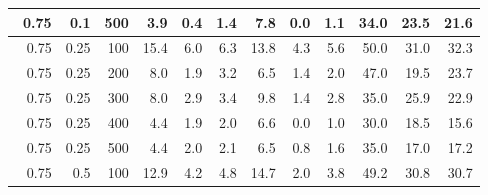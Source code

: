 \begin{longtable}{|r|r|r|r|r|r|r|r|r|r|r|r|}
    \hline \
    0.75                           & 0.1                    & 500                       & 3.9                       & 0.4                       & 1.4                       & 7.8                       & 0.0                       & 1.1                       & 34.0                      & 23.5                      & 21.6                      \\
    \hline \
    0.75                           & 0.25                    & 100                       & 15.4                       & 6.0                       & 6.3                       & 13.8                       & 4.3                       & 5.6                       & 50.0                      & 31.0                      & 32.3                      \\
    \hline \
    0.75                           & 0.25                    & 200                       & 8.0                       & 1.9                       & 3.2                       & 6.5                       & 1.4                       & 2.0                       & 47.0                      & 19.5                      & 23.7                      \\
    \hline \
    0.75                           & 0.25                    & 300                       & 8.0                       & 2.9                       & 3.4                       & 9.8                       & 1.4                       & 2.8                       & 35.0                      & 25.9                      & 22.9                      \\
    \hline \
    0.75                           & 0.25                     & 400                       & 4.4                      & 1.9                       & 2.0                       & 6.6                      & 0.0                       & 1.0                       & 30.0                      & 18.5                      & 15.6                      \\
    \hline \
    0.75                           & 0.25                     & 500                       & 4.4                       & 2.0                       & 2.1                       & 6.5                       & 0.8                       & 1.6                       & 35.0                      & 17.0                      & 17.2                      \\
    \hline \
    0.75                           & 0.5                     & 100                       & 12.9                       & 4.2                       & 4.8                       & 14.7                       & 2.0                       & 3.8                       & 49.2                      & 30.8                      & 30.7                      \\

\end{longtable}
